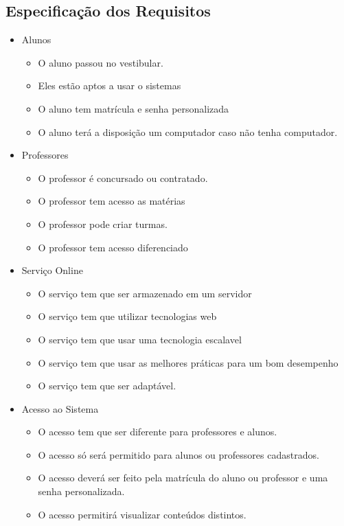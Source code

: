  \subsection{Especificação dos Requisitos}
   \begin{itemize}
    \item Alunos
      \begin{itemize}
       \item O aluno passou no vestibular.
       \item Eles estão aptos a usar o sistemas
       \item O aluno tem matrícula e senha personalizada
       \item O aluno terá a disposição um computador caso não tenha computador.
      \end{itemize}

     \item Professores
     \begin{itemize}
      \item O professor é concursado ou contratado.
      \item O professor tem acesso as matérias
      \item O professor pode criar turmas.
      \item O professor tem acesso diferenciado
     \end{itemize}
     
     \item Serviço Online
     \begin{itemize}
      \item O serviço tem que ser armazenado em um servidor
      \item O serviço tem que utilizar tecnologias web
      \item O serviço tem que usar uma tecnologia escalavel
      \item O serviço tem que usar as melhores práticas para um bom desempenho
      \item O serviço tem que ser adaptável.
     \end{itemize}
     
     \item Acesso ao Sistema
     \begin{itemize}
      \item O acesso tem que ser diferente para professores e alunos.
      \item O acesso só será permitido para alunos ou professores cadastrados.
      \item O acesso deverá ser feito pela matrícula do aluno ou professor e uma senha personalizada.
      \item O acesso permitirá visualizar conteúdos distintos.
     \end{itemize}
     

\end{itemize}
